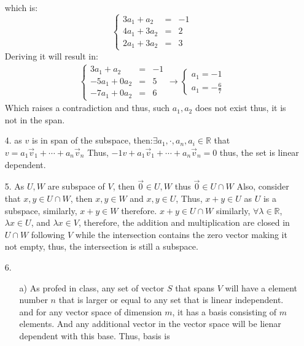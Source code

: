 \documentclass{article}
\begin{document}
\begin{itemize}
    which is:
    \[\left\{ \begin{matrix}
        3a_1+a_2&=&-1\\
        4a_1+3a_2&=&2\\
        2a_1+3a_2&=&3
    \end{matrix} \right.\]
    Deriving it will result in:
    \begin{align}
        \left\{ \begin{matrix}
            3a_1+a_2&=&-1\\
            -5a_1+0a_2&=&5\\
            -7a_1+0a_2&=&6
        \end{matrix} \right.\rightarrow
        \left\{ \begin{matrix}
            a_1 = -1\\
            a_1 = -\frac{6}{7}
        \end{matrix} \right.
    \end{align}
    Which raises a contradiction and thus, such \(a_1,a_2\) does not exist thus, it is not in the span.
    \item[4.] as \(v\) is in span of the subspace, then:\(\exists {a_1,\cdot,a_n}, a_i\in\mathbb{R}\) that \\
    \(v = a_1\overrightarrow{v}_1+\cdots +a_n\overrightarrow{v}_n \)
    Thus, \(-1v+a_1\overrightarrow{v}_1+\cdots +a_n\overrightarrow{v}_n=0\) thus, the set is linear dependent.
    \item [5.] As \(U,W\) are subspace of \(V\), then \(\overrightarrow{0}\in U,W\) thus \(\overrightarrow{0}\in U\cap W\)
    Also, consider that \(x,y\in U\cap W\), then  \(x,y\in W\) and \(x,y\in U\), Thus, \(x+y\in U\) as \(U\) is a subspace, 
    similarly, \(x+y\in W\) therefore. \(x+y\in U\cap W\) similarly, \(\forall \lambda \in \mathbb{R}\), \(\lambda x \in U\), and \(\lambda x \in V\), therefore, the addition
    and multiplication are closed in \(U\cap W\) following \(V\) while the intersection contains the zero vector making it not empty, thus, the intersection is still a subspace.
    \item [6.] 
    \begin{itemize}
    \item [a)] As profed in class, any set of vector \(S\) that spans \(V\) will have a element number \(n\) that is larger or equal to any set that is linear independent.
    and for any vector space of dimension \(m\), it has a basis consisting of \(m\) elements. And any additional vector in the vector space will be lienar dependent with this base. Thus, basis is 

\end{itemize}
\end{itemize}
\end{document}
